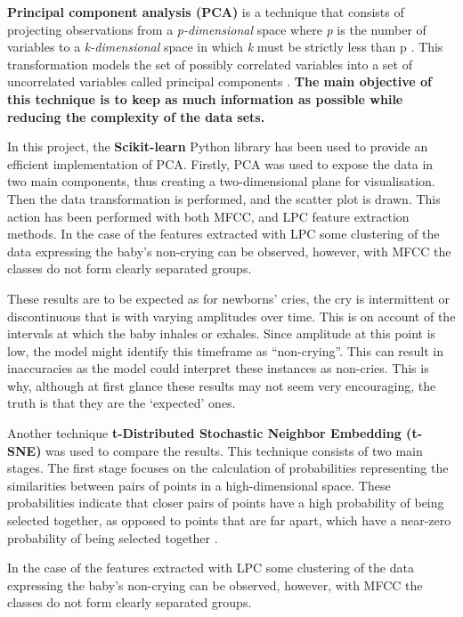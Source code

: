\textbf{Principal component analysis (PCA)} is a technique that consists of projecting observations from a \textit{p-dimensional} space where \textit{p} is the number of variables to a \textit{k-dimensional} space in which \textit{k} must be strictly less than p \cite{Paul2013}. This transformation models the set of possibly correlated variables into a set of uncorrelated variables called principal components \cite{Lipovetsky2009}. \textbf{The main objective of this technique is to keep as much information as possible while reducing the complexity of the data sets.} 

In this project, the \textbf{Scikit-learn} Python library has been used to provide an efficient implementation of PCA. Firstly, PCA was used to expose the data in two main components, thus creating a two-dimensional plane for visualisation. Then the data transformation is performed, and the scatter plot is drawn. This action has been performed with both MFCC, and LPC feature extraction methods. In the case of the features extracted with LPC some clustering of the data expressing the baby's non-crying can be observed, however, with MFCC the classes do not form clearly separated groups. 


\begin{tcolorbox}
These results are to be expected as for newborns’ cries, the cry is intermittent or discontinuous that is with varying amplitudes over time. This is on account of the intervals at which the baby inhales or exhales. Since amplitude at this point is low, the model might identify this timeframe as “non-crying”. This can result in inaccuracies as the model could interpret these instances as non-cries. This is why, although at first glance these results may not seem very encouraging, the truth is that they are the ‘expected’ ones.
\end{tcolorbox}

\newpage
Another technique \textbf{t-Distributed Stochastic Neighbor Embedding (t-SNE)} was used to compare the results. This technique consists of two main stages. The first stage focuses on the calculation of probabilities representing the similarities between pairs of points in a high-dimensional space. These probabilities indicate that closer pairs of points have a high probability of being selected together, as opposed to points that are far apart, which have a near-zero probability of being selected together \cite{arora2018analysis}. 


In the case of the features extracted with LPC some clustering of the data expressing the baby's non-crying can be observed, however, with MFCC the classes do not form clearly separated groups. 

